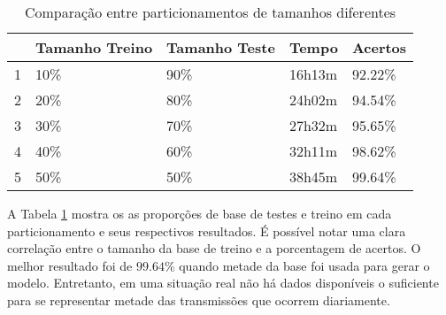 \begin{table}[h]
    \centering
    \caption{Comparação entre particionamentos de tamanhos diferentes}
    \label{tab:partic}
    \begin{tabular}{l|l|l|l|l|}
        \cline{2-5}
                                                        & \multicolumn{1}{c|}{\cellcolor[HTML]{EFEFEF}Tamanho Treino} & \multicolumn{1}{c|}{\cellcolor[HTML]{EFEFEF}Tamanho Teste} & \multicolumn{1}{c|}{\cellcolor[HTML]{EFEFEF}Tempo} & \multicolumn{1}{c|}{\cellcolor[HTML]{EFEFEF}Acertos} \\ \hline
        \multicolumn{1}{|l|}{\cellcolor[HTML]{EFEFEF}1} & 10\%                                                        & 90\%                                                       & 16h13m                                             & 92.22\%                                               \\ \hline
        \multicolumn{1}{|l|}{\cellcolor[HTML]{EFEFEF}2} & 20\%                                                        & 80\%                                                       & 24h02m                                             & 94.54\%                                               \\ \hline
        \multicolumn{1}{|l|}{\cellcolor[HTML]{EFEFEF}3} & 30\%                                                        & 70\%                                                       & 27h32m                                             & 95.65\%                                               \\ \hline
        \multicolumn{1}{|l|}{\cellcolor[HTML]{EFEFEF}4} & 40\%                                                        & 60\%                                                       & 32h11m                                             & 98.62\%                                               \\ \hline
        \multicolumn{1}{|l|}{\cellcolor[HTML]{EFEFEF}5} & 50\%                                                        & 50\%                                                       & 38h45m                                             & 99.64\%                                               \\ \hline
    \end{tabular}
\end{table}

\par A Tabela \ref{tab:partic} mostra os as proporções de base de testes e treino em cada particionamento e seus respectivos
resultados. É possível notar uma clara correlação entre o tamanho da base de treino e a porcentagem de acertos. O
melhor resultado foi de $99.64$\% quando metade da base foi usada para gerar o modelo. Entretanto, em uma situação real
não há dados disponíveis o suficiente para se representar metade das transmissões que ocorrem diariamente.


